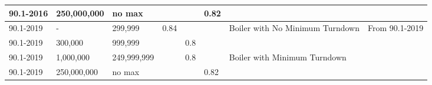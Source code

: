 \begin{table}[h!]
\begin{tabular}{|p{0.5in}|p{0.5in}|p{1.7cm}|p{0.5in}|p{0.5in}|p{0.5in}|p{1in}|p{0.5in}|}
90.1-2016           & 250,000,000 & no max &      &      & 0.82 &                                                     &                                   \\ \hline
90.1-2019           & -           & 299,999       & 0.84 &      &      & \multirow{2}{*}{\parbox{1in}{Boiler with No Minimum Turndown}}  & \multirow{4}{*}{\parbox{0.5in}{From   90.1-2019}} \\ \cline{1-6}
90.1-2019           & 300,000     & 999,999       &      & 0.8  &      &                                                     &                                   \\ \cline{1-7}
90.1-2019           & 1,000,000   & 249,999,999   &      & 0.8  &      & \multirow{2}{*}{\parbox{1in}{Boiler with Minimum Turndown}}     &                                   \\ \cline{1-6}
90.1-2019           & 250,000,000 & no max &      &      & 0.82 &                                                     &                                   \\ \hline
\end{tabular}
\end{table}